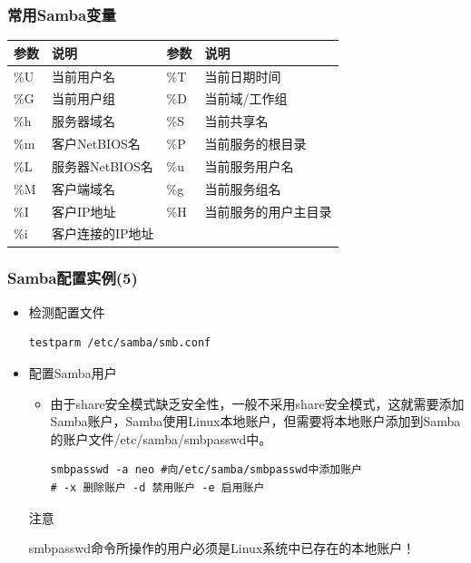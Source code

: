 \documentclass[xcolor=svgnames,presentation]{beamer}
\begin{document}
\begin{frame}
\frametitle{常用Samba变量}
\label{sec-2-12}


\begin{center}
\begin{tabular}{llll}
 参数  &  说明              &  参数  &  说明                  \\
\hline
 \%U   &  当前用户名        &  \%T   &  当前日期时间          \\
 \%G   &  当前用户组        &  \%D   &  当前域/工作组         \\
 \%h   &  服务器域名        &  \%S   &  当前共享名            \\
 \%m   &  客户NetBIOS名     &  \%P   &  当前服务的根目录      \\
 \%L   &  服务器NetBIOS名   &  \%u   &  当前服务用户名        \\
 \%M   &  客户端域名        &  \%g   &  当前服务组名          \\
 \%I   &  客户IP地址        &  \%H   &  当前服务的用户主目录  \\
 \%i   &  客户连接的IP地址  &        &                        \\
\end{tabular}
\end{center}
\end{frame}
\begin{frame}[fragile]
\frametitle{Samba配置实例(5)}
\label{sec-2-13}
\begin{itemize}

\item 检测配置文件\\
\label{sec-2-13-1}%
\begin{verbatim}
testparm /etc/samba/smb.conf
\end{verbatim}

\item 配置Samba用户
\label{sec-2-13-2}%
\begin{itemize}

\item 由于share安全模式缺乏安全性，一般不采用share安全模式，这就需要添加Samba账户，Samba使用Linux本地账户，但需要将本地账户添加到Samba的账户文件/etc/samba/smbpasswd中。\\
\label{sec-2-13-2-1}%
\begin{verbatim}
smbpasswd -a neo #向/etc/samba/smbpasswd中添加账户
# -x 删除账户 -d 禁用账户 -e 启用账户
\end{verbatim}
\end{itemize} %
\begin{block}{注意}
\label{sec-2-13-2-2}

smbpasswd命令所操作的用户必须是Linux系统中已存在的本地账户！
\end{block}
\end{itemize} %
\end{frame}
\end{document}
